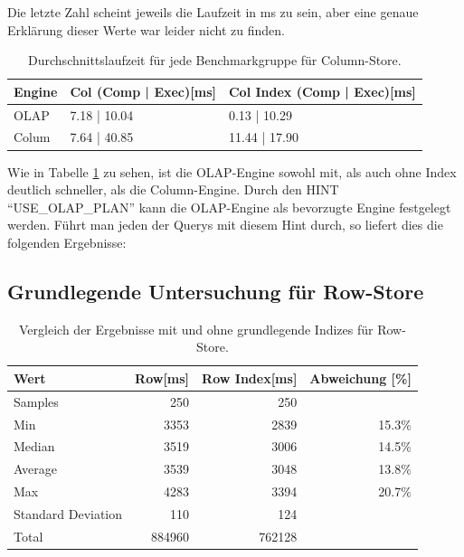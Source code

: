 Die letzte Zahl scheint jeweils die Laufzeit in ms zu sein, aber eine genaue Erklärung dieser Werte war leider nicht zu finden.

\begin{table}[H]
    \centering
    \begin{tabularx}{14cm}{lXX}
        \toprule
        Engine              & Col (Comp | Exec)[ms]                 & Col Index (Comp | Exec)[ms]     \\
        \toprule
        OLAP                & 7.18 | 10.04          & 0.13  | 10.29         \\
        Colum               & 7.64 | 40.85          & 11.44 | 17.90          \\   
        \bottomrule
    \end{tabularx}
	\caption{Durchschnittslaufzeit für jede Benchmarkgruppe für Column-Store.}
    \label{tab:olap}
\end{table}

Wie in Tabelle \ref{tab:olap} zu sehen, ist die OLAP-Engine sowohl mit, als auch ohne Index deutlich schneller, als die Column-Engine. Durch den HINT \enquote{USE\_OLAP\_PLAN} kann die OLAP-Engine als bevorzugte Engine festgelegt werden. Führt man jeden der Querys mit diesem Hint durch, so liefert dies die folgenden Ergebnisse:





\subsection{Grundlegende Untersuchung für Row-Store}

\begin{table}[H]
    \begin{tabularx}{10cm}{lrrr}
        \toprule
        Wert                & Row[ms] & Row Index[ms]   & Abweichung [\%]\\
        \toprule
        Samples             & 250      & 250            &       \\
        Min                 & 3353     & 2839           &  15.3\%     \\
        Median              & 3519     & 3006           &  14.5\%     \\
        Average             & 3539     & 3048           &  13.8\%     \\
        Max                 & 4283     & 3394           &  20.7\%     \\
        Standard Deviation  & 110      & 124            &       \\
        Total               & 884960   & 762128         &       \\ 
        \bottomrule
    \end{tabularx}
\caption{Vergleich der Ergebnisse mit und ohne grundlegende Indizes für Row-Store.}
\label{tab:basic_index_row}
\end{table}





